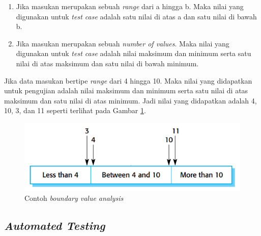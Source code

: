 \begin{enumerate}[
leftmargin=0pt, itemindent=20pt,
labelwidth=15pt, labelsep=5pt, listparindent=0.7cm,
align=left]

\item Jika masukan merupakan sebuah \emph{range} dari a hingga
  b. Maka nilai yang digunakan untuk \emph{test case} adalah satu
  nilai di atas a dan satu nilai di bawah b.
\item Jika masukan merupakan sebuah \emph{number of values}. Maka
  nilai yang digunakan untuk \emph{test case} adalah nilai maksimum
  dan minimum serta satu nilai di atas maksimum dan satu nilai di
  bawah minimum.
\end{enumerate}

Jika data masukan bertipe \emph{range} dari 4 hingga 10. Maka nilai
yang didapatkan untuk pengujian adalah nilai maksimum dan minimum
serta satu nilai di atas maksimum dan satu nilai di atas minimum. Jadi
nilai yang didapatkan adalah 4, 10, 3, dan 11 seperti terlihat pada
Gambar \ref{fig:contoh-bva-marked}.

\begin{figure}[H]
  \centering
  \includegraphics[width=.6\linewidth]{img/contoh-bva-marked}
  \caption{Contoh \emph{boundary value analysis} \parencite{sommerville2014software}}
  \label{fig:contoh-bva-marked}
\end{figure}

\subsection{\emph{Automated Testing}}

